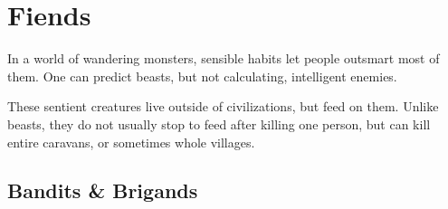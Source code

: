 \chapter[Fiends in the Forest]{Fiends}
\label{fiends}

\toggletrue{genExamples}

In a world of wandering monsters, sensible habits let people outsmart most of them.
One can predict beasts, but not calculating, intelligent enemies.

These sentient creatures live outside of civilizations, but feed on them.
Unlike beasts, they do not usually stop to feed after killing one person, but can kill entire caravans, or sometimes whole \glspl{village}.

\section{Bandits \& Brigands}

